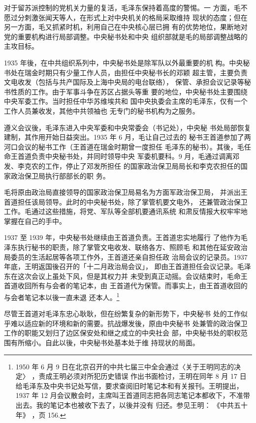 对于留苏派控制的党机关力量的复活，毛泽东保持着高度的警惕。一
方面，毛不愿过分刺激张闻天等人，在形式上对中央机关的格局采取维持
现状的态度；但在另一方面，毛又抓紧时机，利用自己在中央核心层已拥
有的优势地位，果断地对党的重要机构进行局部调整。中央秘书处和中央
组织部就是毛的局部调整战略的主攻目标。

1935 年後，在中共组织系列中，中央秘书处是除军队以外最重要的机
构。中央秘书处在瑞金时期只有少量工作人员，由担任中央秘书长的邓颖
超主管，主要负责文电收发（包括与共产国际及上海中央局的电台联络），
保管、承担会议记录等秘书性质的工作。由于军事斗争在苏区占据头等重
要的地位，中央秘书处主要围绕中央军委工作。当时担任中华苏维埃共和
国中央执委会主席的毛泽东，仅有一个工作人员兼收发，其他中共领袖也
无专门的秘书机构为之服务。

遵义会议後，毛泽东进入中央军委和中央常委会（书记处），中央秘
书处局部恢复建制，其作用开始日益突出。1935 年 6 月，毛让自己过去的
秘书王首道参加了两河口会议的秘书工作（王首道在瑞金时期曾一度担任
毛泽东的秘书）。其後，毛任命王首道负责中央秘书处，并同时领导中央
军委机要科。9 月，毛通过调离邓发、李克农的工作，停止了邓发所担任
的国家政治保卫局局长和李克农担任的国家政治保卫局执行部部长的职
务。

毛将原由政治局直接领导的国家政治保卫局易名为方面军政治保卫局，
并派出王首道担任该局领导。此时的中央秘书处，除了掌管机要文电外，
还兼管政治保卫工作。毛通过这些措施，将党、军队等全部机要通讯系统
和肃反情报大权牢牢地掌握在自己的手中。

1937 至 1939 年，中央秘书处继续由王首道负责。王首道忠实地履行
了他作为毛泽东执行秘书的职责，除了掌管文电收发、联络各方、照顾毛
和其他在延安政治局委员的生活起居等各项工作外，王首道还亲自担任政
治局会议的记录员。1937 年底，王明返国後召开的「十二月政治局会议」，
即由王首道担任会议记录。毛泽东在这次会议上虽处下风，但是其权力并
未受到真正动摇。会议结束时，毛命王首道收回所有与会者的笔记本，由
王首道代为保管。而事实上，由王首道收回的与会者笔记本以後一直未退
还本人。\footnote{ 1950 年 6 月 9 日在北京召开的中共七届三中全会通过〈关于王明同志的决定〉
，责成王明必须对所犯历史错误
作出书面检讨，王明在同年 8 月 17 日给毛泽东及中央书记处写信，要求查阅旧时笔记本和有关报刊。王明提出，1937
年 12 月会议散会时，主席叫王首道同志把各同志笔记本都收下，不准带出去。我的笔记本也被收下去了，以後并没有
归还。参见王明：
《中共五十年》
，页 156. 
}

尽管王首道对毛泽东忠心耿耿，但在纷繁复杂的新形势下，中央秘书
处的工作似乎难以适应新的环境和新的需要。抗战爆发後，原由中央秘书
处兼管的政治保卫工作的职能又划归了边区保安处和继之成立的中央社会
部，中央秘书处的职权范围有所缩小。自此以後，中央秘书处基本处于维
持现状的局面。

